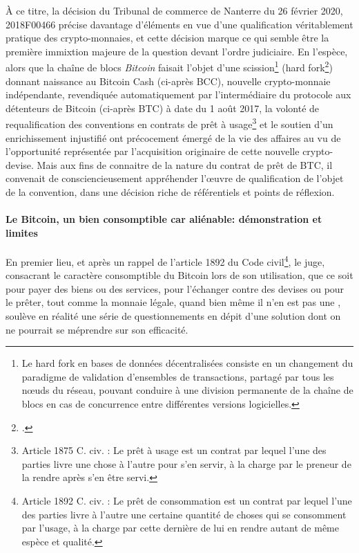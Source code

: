 {À ce titre, la décision du Tribunal de commerce de Nanterre du 26 février 2020, \no 2018F00466 précise davantage d'éléments en vue d'une qualification véritablement pratique des crypto-monnaies, et cette décision marque ce qui semble être la première immixtion majeure de la question devant l'ordre judiciaire. En l'espèce, alors que la chaîne de blocs \emph{Bitcoin} faisait l'objet d'une scission\footnote{Le \og \gls{hard fork} \fg{} en bases de données décentralisées consiste en un changement du paradigme de validation d'ensembles de transactions, partagé par tous les n\oe{}uds du réseau, pouvant conduire à une division permanente de la chaîne de blocs en cas de concurrence entre différentes versions logicielles.} (\og hard fork\fg\footnote{.}) donnant naissance au Bitcoin Cash (ci-après \acrshort{BCC}),  nouvelle crypto-monnaie indépendante, revendiquée automatiquement par l'intermédiaire du protocole aux détenteurs de Bitcoin (ci-après \acrshort{BTC}) à date du 1 août 2017, la volonté de requalification des conventions en contrats de prêt à usage\footnote{Article 1875 C. civ. : \og Le prêt à usage est un contrat par lequel l'une des parties livre une chose à l'autre pour s'en servir, à la charge par le preneur de la rendre après s'en être servi\fg{}.} et le soutien d'un enrichissement injustifié ont précocement émergé de la vie des affaires au vu de l'opportunité représentée par l'acquisition originaire de cette nouvelle crypto-devise. Mais aux fins de connaitre de la nature du contrat de prêt de BTC, il convenait de consciencieusement appréhender l'\oe{}uvre de qualification de l'objet de la convention, dans une décision riche de référentiels et points de réflexion. 

 \paragraph{Le Bitcoin, un bien consomptible car aliénable: démonstration et limites}

En premier lieu, et après un rappel de l'article 1892 du Code civil\footnote{Article 1892 C. civ. : \og Le prêt de consommation est un contrat par lequel l'une des parties livre à l'autre une certaine quantité de choses qui se consomment par l'usage, à la charge par cette dernière de lui en rendre autant de même espèce et qualité\fg{}.}, le juge, consacrant le caractère consomptible du Bitcoin \og lors de son utilisation, que ce soit pour payer des biens ou des services, pour l'échanger contre des devises ou pour le prêter, tout comme la monnaie légale, quand bien même il n'en est pas une \fg{}, soulève en réalité une série de questionnements en dépit d'une solution dont on ne pourrait se méprendre sur son efficacité.\par 

}
